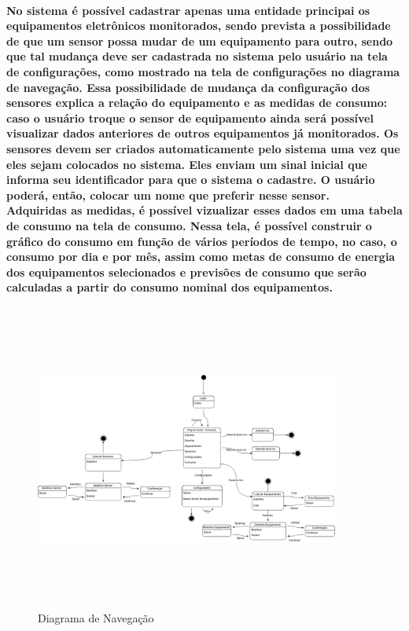\paragraph{No sistema é possível cadastrar apenas uma entidade principai os equipamentos eletrônicos monitorados, sendo prevista a possibilidade de que um sensor possa mudar de um equipamento para outro, sendo que tal mudança deve ser cadastrada no sistema pelo  usuário na tela de configurações, como mostrado na tela de configurações no diagrama de navegação.  Essa possibilidade de mudança da configuração dos sensores explica a relação do equipamento e as medidas de consumo: caso o usuário troque o sensor de equipamento ainda será possível visualizar dados anteriores de outros equipamentos já monitorados.
Os sensores devem ser criados automaticamente pelo sistema uma vez que eles sejam colocados no sistema. Eles enviam um sinal inicial que informa seu identificador para que o sistema o cadastre. O usuário poderá, então, colocar um nome que preferir nesse sensor.\\
Adquiridas as medidas, é possível vizualizar esses dados em uma tabela de consumo na tela de consumo. Nessa tela, é possível construir o gráfico do consumo em função de vários períodos de tempo, no caso, o consumo por dia e por mês, assim como metas de consumo de energia dos equipamentos selecionados e previsões de consumo que serão calculadas a partir do consumo nominal dos equipamentos.
}

\begin{figure}[H]
\begin{center}
\includegraphics[width=10cm,height=10cm,keepaspectratio]{figuras/diagrama_navegacao.png}
\caption{\label{fig:diagrama navegacao} Diagrama de Navegação}
\end{center}
\end{figure}


